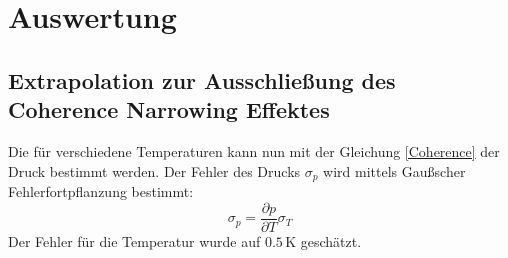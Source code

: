\section{Auswertung}
\subsection{Extrapolation zur Ausschließung des Coherence Narrowing Effektes}
Die für verschiedene Temperaturen kann nun mit der Gleichung \ref{Coherence} der Druck bestimmt werden. Der Fehler des Drucks $\sigma_p$ wird mittels Gaußscher Fehlerfortpflanzung bestimmt:
\begin{equation}
\sigma_p = \frac{\partial p}{\partial T} \sigma_T
\end{equation}
Der Fehler für die Temperatur wurde auf $0.5\,$K geschätzt.